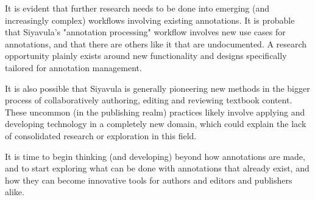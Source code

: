 It is evident that further research needs to be done into emerging (and increasingly complex) workflows involving existing annotations. It is probable that Siyavula's "annotation processing" workflow involves new use cases for annotations, and that there are others like it that are undocumented. A research opportunity plainly exists around new functionality and designs specifically tailored for annotation management. 

It is also possible that Siyavula is generally pioneering new methods in the bigger process of collaboratively authoring, editing and reviewing textbook content. These uncommon (in the publishing realm) practices likely involve applying and developing technology in a completely new domain, which could explain the lack of consolidated research or exploration in this field.

It is time to begin thinking (and developing) beyond how annotations are made, and to start exploring what can be done with annotations that already exist, and how they can become innovative tools for authors and editors and publishers alike. 
